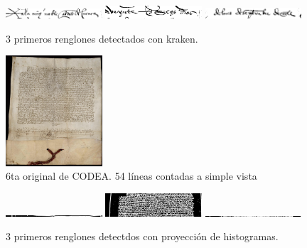 \documentclass[11pt,a4paper]{article}
\begin{document}
\begin{figure}[H] 
\centering 
\begin{minipage}{1.0\textwidth} 
\includegraphics[width=0.32\textwidth]{5_CODEA_1_kraken.png} 
\includegraphics[width=0.32\textwidth]{5_CODEA_2_kraken.png} 
\includegraphics[width=0.32\textwidth]{5_CODEA_3_kraken.png} 
\caption{3 primeros renglones detectados con kraken.} 
\label{fig:3 líneas kraken 5ta CODEA} 
\end{minipage} 
\end{figure}

\begin{figure}[H] 
\centering 
\begin{minipage}{1.0\textwidth} 
\includegraphics[width=0.32\textwidth]{CODEA-2651_1r.jpg} 
\caption{6ta original de CODEA. 54 líneas contadas a simple vista} 
\label{fig:6ta CODEA} 
\end{minipage} 
\end{figure}

\begin{figure}[H] 
\centering 
\begin{minipage}{1.0\textwidth} 
\includegraphics[width=0.32\textwidth]{6_CODEA_1_PH.png} 
\includegraphics[width=0.32\textwidth]{6_CODEA_2_PH.png} 
\includegraphics[width=0.32\textwidth]{6_CODEA_3_PH.png} 
\caption{3 primeros renglones detectdos con proyección de histogramas.} 
\label{fig:3 líneas PH 6Ta CODEA} 
\end{minipage} 
\end{figure}
\end{document}
